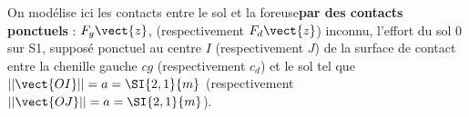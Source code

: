 On modélise ici les contacts entre le sol et la foreuse\textbf{par des contacts ponctuels}  :
$F_g \vect{z}$, (respectivement  $F_d \vect{z}$) inconnu, l’effort du sol 0 sur S1, supposé ponctuel au centre $I$ (respectivement  $J$) de la surface de contact entre la chenille gauche $cg$ (respectivement  $c_d$) et le sol tel que $||\vect{OI}|| = a=\SI{2,1}{m}$ (respectivement  $||\vect{OJ}|| = a=\SI{2,1}{m}$).

